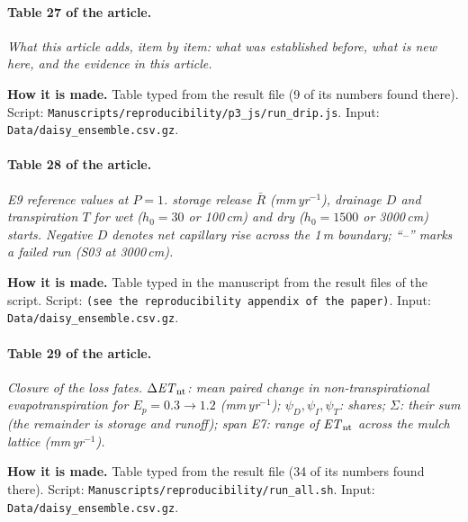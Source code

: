 \paragraph{Table 27 of the article.} \emph{What this article adds, item by item: what was established before, what is new here, and the evidence in this article.}

\textbf{How it is made.} Table typed from the result file (9 of its numbers found there). Script: \nolinkurl{Manuscripts/reproducibility/p3_js/run_drip.js}. Input: \nolinkurl{Data/daisy_ensemble.csv.gz}.

\paragraph{Table 28 of the article.} \emph{E9 reference values at $P=1$. storage release $\bar R$ (mm\,yr$^{-1}$), drainage $D$ and transpiration $T$ for wet ($h_0=30$ or 100\,cm) and dry ($h_0=1500$ or 3000\,cm) starts. Negative $D$ denotes net capillary rise across the 1\,m boundary; ``--'' marks a failed run (S03 at 3000\,cm).}

\textbf{How it is made.} Table typed in the manuscript from the result files of the script. Script: \nolinkurl{(see the reproducibility appendix of the paper)}. Input: \nolinkurl{Data/daisy_ensemble.csv.gz}.

\paragraph{Table 29 of the article.} \emph{Closure of the loss fates. $\Delta\mathit{ET}_{\mathrm{nt}}$: mean paired change in non-transpirational evapotranspiration for $E_p=0.3\to1.2$ (mm\,yr$^{-1}$); $\psi_D,\psi_I,\psi_T$: shares; $\Sigma$: their sum (the remainder is storage and runoff); span E7: range of $\mathit{ET}_{\mathrm{nt}}$ across the mulch lattice (mm\,yr$^{-1}$).}

\textbf{How it is made.} Table typed from the result file (34 of its numbers found there). Script: \nolinkurl{Manuscripts/reproducibility/run_all.sh}. Input: \nolinkurl{Data/daisy_ensemble.csv.gz}.
